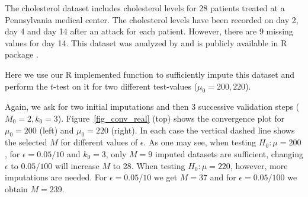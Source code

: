 \documentclass[11pt,a5paper,twoside]{book}
\begin{document}
{{The cholesterol dataset includes cholesterol levels for 28 patients treated at a Pennsylvania medical center. The cholesterol levels have been recorded on day 2, day 4 and day 14 after an attack for each patient. However, there are 9 missing values for day 14. This dataset was analyzed by \citet[Chapter 5]{schafer1997} and is publicly available in \textsc{R} package {}. 

Here we use our \textsc{R} implemented function {} to sufficiently impute this dataset and perform the $t$-test on it for two different test-values ($\mu_0=200, 220$). 

%
%

Again, we ask for two initial imputations and then 3 successive validation steps ($M_0=2, k_0=3$). Figure~\ref{fig_conv_real} (top) shows the convergence plot for $\mu_0=200$ (left) and $\mu_0=220$ (right). In each case the vertical dashed line shows the selected $M$ for different values of $\epsilon$. As one may see, when testing $H_0: \mu=200$, for $\epsilon=0.05/10$ and $k_0=3$, only $M=9$ imputed datasets are sufficient, changing $\epsilon$ to $0.05/100$ will increase $M$ to 28. When testing $H_0: \mu=220$, however, more imputations are needed. For $\epsilon=0.05/10$ we get $M=37$ and for $\epsilon=0.05/100$ we obtain $M=239$.



}}
\end{document}
